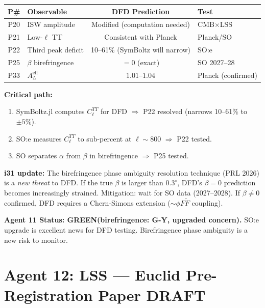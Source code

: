 \documentclass[11pt,a4paper]{article}
\newcommand{\GREEN}{\textcolor{dfdgreen}{\textbf{GREEN}}}
\newcommand{\GY}{\textcolor{dfdgy}{\textbf{G-Y}}}
\begin{document}
\begin{center}
\begin{longtable}{clcl}
\toprule
\textbf{P\#} & \textbf{Observable} & \textbf{DFD Prediction} & \textbf{Test} \\
\midrule
\endfirsthead
P20 & ISW amplitude & Modified (computation needed) & CMB$\times$LSS \\
P21 & Low-$\ell$ TT & Consistent with Planck & Planck/SO \\
P22 & Third peak deficit & 10--61\% (SymBoltz will narrow) & SO:e \\
P25 & $\beta$ birefringence & $= 0$ (exact) & SO 2027--28 \\
P33 & $A_L^\mathrm{eff}$ & $1.01$--$1.04$ & Planck (confirmed) \\
\bottomrule
\end{longtable}
\end{center}

\textbf{Critical path:}
\begin{enumerate}
\item SymBoltz.jl computes $C_\ell^{TT}$ for DFD $\Rightarrow$ P22 resolved (narrows 10--61\% to $\pm 5\%$).
\item SO:e measures $C_\ell^{TT}$ to sub-percent at $\ell \sim 800$ $\Rightarrow$ P22 tested.
\item SO separates $\alpha$ from $\beta$ in birefringence $\Rightarrow$ P25 tested.
\end{enumerate}

\textbf{i31 update:} The birefringence phase ambiguity resolution technique (PRL 2026) is a \emph{new threat} to DFD. If the true $\beta$ is larger than $0.3^\circ$, DFD's $\beta = 0$ prediction becomes increasingly strained. Mitigation: wait for SO data (2027--2028). If $\beta \neq 0$ confirmed, DFD requires a Chern-Simons extension ($\sim \phi F\tilde{F}$ coupling).

\textbf{Agent 11 Status: \GREEN (birefringence: \GY, upgraded concern).} SO:e upgrade is excellent news for DFD testing. Birefringence phase ambiguity is a new risk to monitor.

\section{Agent 12: LSS --- Euclid Pre-Registration Paper DRAFT}
\end{document}
